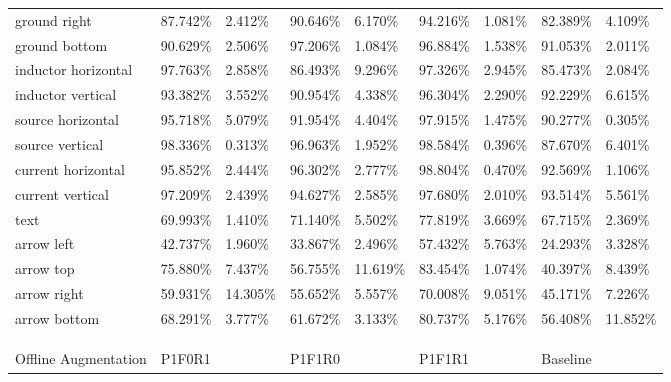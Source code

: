 \begin{table}[H]
\begin{center}
\begin{tabular}{|l|l|l|l|l|l|l|l|l|}
\rowcolor{lightgray!50}
ground right                    & 87.742\% & 2.412\%  & 90.646\% & 6.170\%  & 94.216\% & 1.081\% & 82.389\% & 4.109\%    \\
ground bottom                   & 90.629\% & 2.506\%  & 97.206\% & 1.084\%  & 96.884\% & 1.538\% & 91.053\% & 2.011\%    \\
\rowcolor{lightgray!50}
inductor horizontal             & 97.763\% & 2.858\%  & 86.493\% & 9.296\%  & 97.326\% & 2.945\% & 85.473\% & 2.084\%    \\
inductor vertical               & 93.382\% & 3.552\%  & 90.954\% & 4.338\%  & 96.304\% & 2.290\% & 92.229\% & 6.615\%    \\
\rowcolor{lightgray!50}
source horizontal               & 95.718\% & 5.079\%  & 91.954\% & 4.404\%  & 97.915\% & 1.475\% & 90.277\% & 0.305\%    \\
source vertical                 & 98.336\% & 0.313\%  & 96.963\% & 1.952\%  & 98.584\% & 0.396\% & 87.670\% & 6.401\%    \\
\rowcolor{lightgray!50}
current horizontal              & 95.852\% & 2.444\%  & 96.302\% & 2.777\%  & 98.804\% & 0.470\% & 92.569\% & 1.106\%    \\
current vertical                & 97.209\% & 2.439\%  & 94.627\% & 2.585\%  & 97.680\% & 2.010\% & 93.514\% & 5.561\%    \\
\rowcolor{lightgray!50}
text                            & 69.993\% & 1.410\%  & 71.140\% & 5.502\%  & 77.819\% & 3.669\% & 67.715\% & 2.369\%    \\
arrow left                      & 42.737\% & 1.960\%  & 33.867\% & 2.496\%  & 57.432\% & 5.763\% & 24.293\% & 3.328\%    \\
\rowcolor{lightgray!50}
arrow top                       & 75.880\% & 7.437\%  & 56.755\% & 11.619\% & 83.454\% & 1.074\% & 40.397\% & 8.439\%    \\
arrow right                     & 59.931\% & 14.305\% & 55.652\% & 5.557\%  & 70.008\% & 9.051\% & 45.171\% & 7.226\%    \\
\rowcolor{lightgray!50}
arrow bottom                    & 68.291\% & 3.777\%  & 61.672\% & 3.133\%  & 80.737\% & 5.176\% & 56.408\% & 11.852\%   \\
\hline
\\\\\\
\hline
Offline Augmentation            & P1F0R1   &          & P1F1R0   &          & \cellcolor{green}P1F1R1   &           & Baseline &          \\

\end{tabular}
\end{center}
\end{table}
